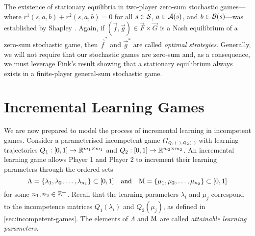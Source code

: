     The existence of stationary equilibria in two-player zero-sum stochastic games---where $r^1(s, a, b) + r^2(s, a, b) = 0$ for all $s \in \mathcal{S}$, $a \in \mathcal{A}(s)$, and $b \in \mathcal{B}(s)$---was established by Shapley \parencite{Shapley1953}.
    Again, if $(\vec{f}, \vec{g}) \in \vec{F} \times \vec{G}$ is a Nash equilibrium of a zero-sum stochastic game, then $\vec{f}^*$ and $\vec{g}^*$ are called \emph{optimal strategies}.
    Generally, we will not require that our stochastic games are zero-sum and, as a consequence, we must leverage Fink's \parencite{Fink1964} result showing that a stationary equilibrium always exists in a finite-player general-sum stochastic game.



\section{Incremental Learning Games} \label{sec:incremental-learning-games}
    We are now prepared to model the process of incremental learning in incompetent games.
    Consider a parameterised incompetent game $G_\ms{Q_1(\funcdot), Q_2(\funcdot)}$ with learning trajectories $Q_1 : [0, 1] \to \mathbb{R}^{m_1 \times m_1}$ and $Q_2 : [0, 1] \to \mathbb{R}^{m_2 \times m_2}$.
    An incremental learning game allows Player 1 and Player 2 to increment their learning parameters through the ordered sets 
    \[
        \Lambda 
            = \{\lambda_1, \lambda_2, \ldots, \lambda_{n_1}\} \subset [0, 1]
        \quad\text{and}\quad
        \mathrm{M} 
            = \{\mu_1, \mu_2, \ldots, \mu_{n_2}\} \subset [0, 1]
    \]
    for some $n_1, n_2 \in \mathbb{Z}^+$.
    Recall that the learning parameters $\lambda_i$ and $\mu_j$ correspond to the incompetence matrices $Q_1(\lambda_i)$ and $Q_2(\mu_j)$, as defined in \autoref{sec:incompetent-games}.
    The elements of $\Lambda$ and $\mathrm{M}$ are called \emph{attainable learning parameters}.

